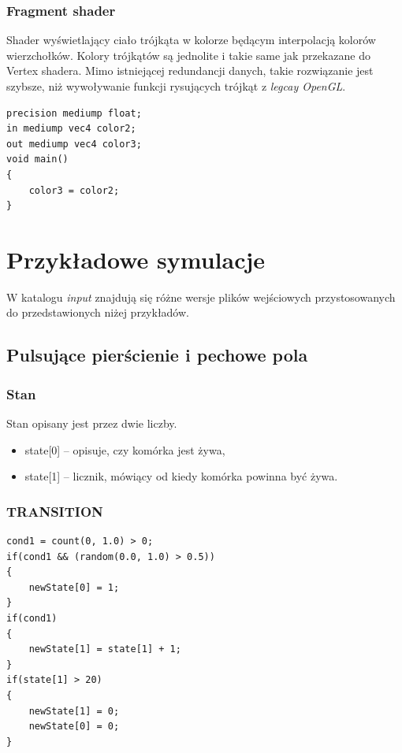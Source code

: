 \documentclass[declaration,shortabstract, inz]{iithesis}
\theoremstyle{definition} \newtheorem{definition}{Definicja}[]
\theoremstyle{plain} \newtheorem{remark}[definition]{Obserwacja}
\theoremstyle{plain} \newtheorem{theorem}[definition]{Twierdzenie}
\theoremstyle{plain} \newtheorem{example}{Przykład}[definition]
\theoremstyle{plain} \newtheorem{lemma}[definition]{Lemat}
\begin{document}
\subsection{Fragment shader}
Shader wyświetlający ciało trójkąta w kolorze będącym interpolacją kolorów wierzchołków. Kolory trójkątów są jednolite i takie same jak przekazane do Vertex shadera. Mimo istniejącej redundancji danych, takie rozwiązanie jest szybsze, niż wywoływanie funkcji rysujących trójkąt z \textit{legcay OpenGL}.
\begin{center}
\begin{lstlisting}
precision mediump float;
in mediump vec4 color2;
out mediump vec4 color3;
void main()
{
	color3 = color2;
}
\end{lstlisting}
\end{center}

\chapter{Przykładowe symulacje}

W katalogu \textit{input} znajdują się różne wersje plików wejściowych przystosowanych do przedstawionych niżej przykładów.

\section{Pulsujące pierścienie i pechowe pola}

\subsection{Stan}
Stan opisany jest przez dwie liczby.
\begin{itemize}
\item state[0] -- opisuje, czy komórka jest żywa,
\item state[1] -- licznik, mówiący od kiedy komórka powinna być żywa.
\end{itemize}

\subsection{TRANSITION}

\begin{center}
\begin{lstlisting}
cond1 = count(0, 1.0) > 0;
if(cond1 && (random(0.0, 1.0) > 0.5))
{
    newState[0] = 1;
}
if(cond1)
{
    newState[1] = state[1] + 1;
}
if(state[1] > 20)
{
    newState[1] = 0;
    newState[0] = 0;
} 
\end{lstlisting}
\end{center}
\end{document}
